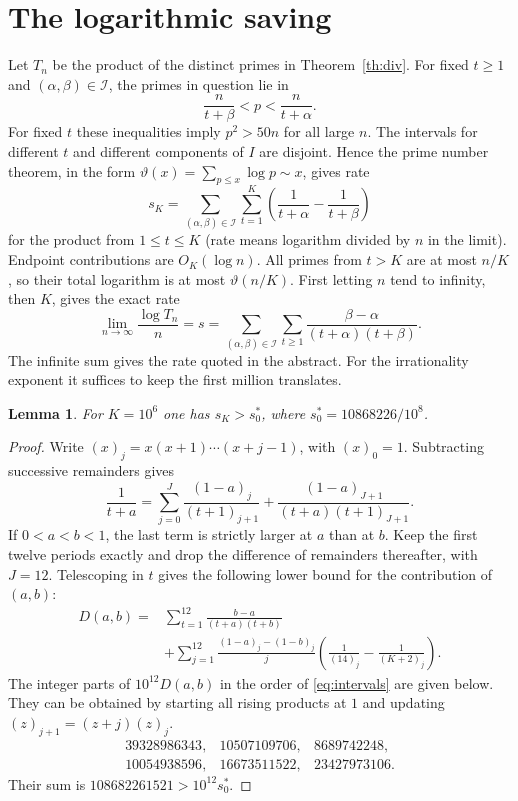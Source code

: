 \documentclass[11pt]{article}
\newtheorem{lemma}[theorem]{Lemma}
\begin{document}
\section{The logarithmic saving}
Let $T_n$ be the product of the distinct primes in Theorem~\ref{th:div}.
For fixed $t\ge1$ and $(\alpha,\beta)\in\mathcal I$, the primes in
question lie in
\[
  \frac{n}{t+\beta}<p<\frac{n}{t+\alpha}.
\]
For fixed $t$ these inequalities imply $p^2>50n$ for all large $n$.
The intervals for different $t$ and different components of $I$ are
disjoint. Hence the prime number theorem, in the form
$\vartheta(x)=\sum_{p\le x}\log p\sim x$, gives rate
\[
 s_K=\sum_{(\alpha,\beta)\in\mathcal I}\sum_{t=1}^{K}
       \left(\frac{1}{t+\alpha}-\frac{1}{t+\beta}\right)
\]
for the product from $1\le t\le K$ (rate means logarithm divided by
$n$ in the limit). Endpoint contributions are $O_K(\log n)$.
All primes from $t>K$ are at most $n/K$, so their total logarithm is
at most $\vartheta(n/K)$. First letting $n$ tend to infinity, then
$K$, gives the exact rate
\begin{equation}\label{eq:rate}
 \lim_{n\to\infty}\frac{\log T_n}{n}
 =s=\sum_{(\alpha,\beta)\in\mathcal I}\sum_{t\ge1}
       \frac{\beta-\alpha}{(t+\alpha)(t+\beta)} .
\end{equation}
The infinite sum gives the rate quoted in the abstract. For the
irrationality exponent it suffices to keep the first million translates.

\begin{lemma}\label{lem:num}
For $K=10^6$ one has $s_K>s_0^*$, where $s_0^*=10868226/10^8$.
\end{lemma}
\begin{proof}
Write $(x)_j=x(x+1)\cdots(x+j-1)$, with $(x)_0=1$. Subtracting
successive remainders gives
\[
 \frac1{t+a}=\sum_{j=0}^J\frac{(1-a)_j}{(t+1)_{j+1}}
       +\frac{(1-a)_{J+1}}{(t+a)(t+1)_{J+1}} .
\]
If $0<a<b<1$, the last term is strictly larger at $a$ than at $b$.
Keep the first twelve periods exactly and drop the difference of
remainders thereafter, with $J=12$. Telescoping in $t$ gives the
following lower bound for the contribution of $(a,b)$:
\begin{align*}
 D(a,b)={}&\sum_{t=1}^{12}\frac{b-a}{(t+a)(t+b)}\\
   &+\sum_{j=1}^{12}\frac{(1-a)_j-(1-b)_j}{j}
       \left(\frac1{(14)_j}-\frac1{(K+2)_j}\right).
\end{align*}
The integer parts of $10^{12}D(a,b)$ in the
order of \eqref{eq:intervals} are given below. They can be obtained
by starting all rising products at $1$ and updating
$(z)_{j+1}=(z+j)(z)_j$.
\[
 \begin{array}{rrr}
 39328986343,&10507109706,&8689742248,\\
 10054938596,&16673511522,&23427973106 .
 \end{array}
\]
Their sum is $108682261521>10^{12}s_0^*$.
\end{proof}
\end{document}
